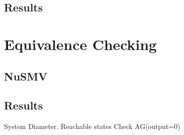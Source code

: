 \documentclass[11pt]{article}
\begin{document}
	\subsection{Results}

%

\section{Equivalence Checking} 
\subsection{NuSMV}
\subsection{Results}
System Diameter.
Reachable states
Check AG(output=0)

%  
\end{document}
